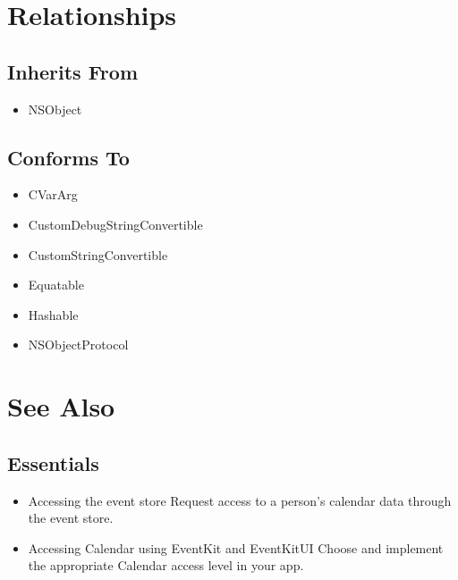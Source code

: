 \documentclass{article}
\begin{document}
\section*{Relationships}

\subsection*{Inherits From}

\begin{itemize}
    \item NSObject
\end{itemize}

\subsection*{Conforms To}

\begin{itemize}
    \item CVarArg
    \item CustomDebugStringConvertible
    \item CustomStringConvertible
    \item Equatable
    \item Hashable
    \item NSObjectProtocol
\end{itemize}

\section*{See Also}

\subsection*{Essentials}

\begin{itemize}
    \item Accessing the event store
    Request access to a person's calendar data through the event store.

    \item Accessing Calendar using EventKit and EventKitUI
    Choose and implement the appropriate Calendar access level in your app.
\end{itemize}

\newpage
\end{document}
